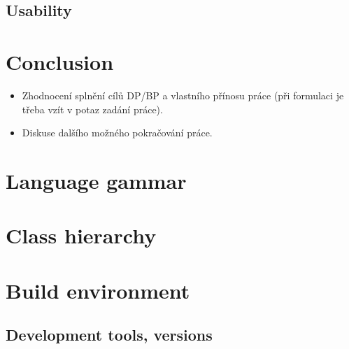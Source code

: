\documentclass[11pt,twoside,a4paper]{book}
\begin{document}
\section{Usability}



\chapter{Conclusion}

\begin{itemize}
\item Zhodnocení splnění cílů DP/BP a  vlastního přínosu práce (při formulaci je třeba vzít v potaz zadání práce).
\item Diskuse dalšího možného pokračování práce.
\end{itemize}



%
%
%



\appendix


\chapter{Language gammar}



\chapter{Class hierarchy}



\chapter{Build environment}

\section{Development tools, versions}
\end{document}
